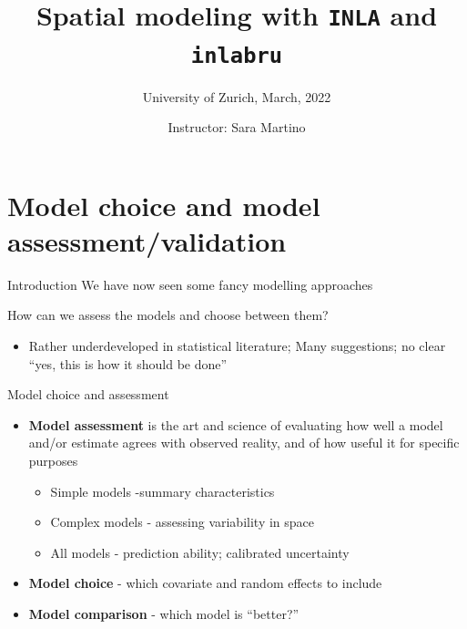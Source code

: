 \documentclass[
  ignorenonframetext,
]{beamer}
\title{Spatial modeling with \texttt{INLA} and \texttt{inlabru}}
\subtitle{University of Zurich, March, 2022}
\author{Instructor: Sara Martino}
\date{}
\institute{Department of Mathematical Science (NTNU)}
\providecommand{\tightlist}{%
  \setlength{\itemsep}{0pt}\setlength{\parskip}{0pt}}
\begin{document}
\frame{\titlepage}

\begin{frame}[allowframebreaks]
  \tableofcontents[hideallsubsections]
\end{frame}
\begin{frame}
\end{frame}

\hypertarget{model-choice-and-model-assessmentvalidation}{%
\section{Model choice and model
assessment/validation}\label{model-choice-and-model-assessmentvalidation}}

\begin{frame}{Introduction}
\protect\hypertarget{introduction}{}
We have now seen some fancy modelling approaches

\pause

How can we assess the models and choose between them?

\begin{itemize}
\tightlist
\item
  Rather underdeveloped in statistical literature; Many suggestions; no
  clear ``yes, this is how it should be done''
\end{itemize}
\end{frame}

\begin{frame}{Model choice and assessment}
\protect\hypertarget{model-choice-and-assessment}{}
\begin{itemize}
\item
  \textbf{Model assessment} is the art and science of evaluating how
  well a model and/or estimate agrees with observed reality, and of how
  useful it for specific purposes

  \begin{itemize}
  \tightlist
  \item
    Simple models -summary characteristics
  \item
    Complex models - assessing variability in space
  \item
    All models - prediction ability; calibrated uncertainty
  \end{itemize}
\item
  \textbf{Model choice} - which covariate and random effects to include
\item
  \textbf{Model comparison} - which model is ``better?''
\end{itemize}
\end{frame}
\end{document}
